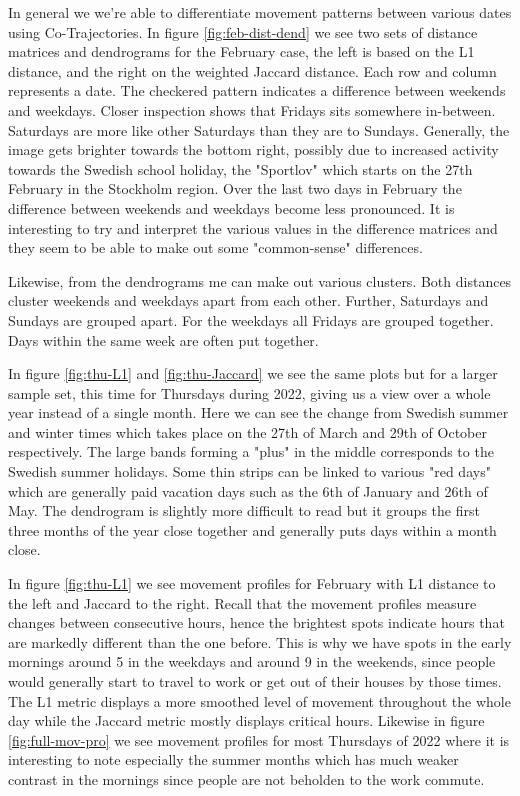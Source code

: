 \documentclass[../main.tex]{subfiles}
\begin{document}
In general we we're able to differentiate movement patterns between various dates using Co-Trajectories. In figure \ref{fig:feb-dist-dend} we see two sets of distance matrices and dendrograms for the February case, the left is based on the L1 distance, and the right on the weighted Jaccard distance. Each row and column represents a date. The checkered pattern indicates a difference between weekends and weekdays. Closer inspection shows that Fridays sits somewhere in-between. Saturdays are more like other Saturdays than they are to Sundays. Generally, the image gets brighter towards the bottom right, possibly due to increased activity towards the Swedish school holiday, the "Sportlov" which starts on the 27th February in the Stockholm region. Over the last two days in February the difference between weekends and weekdays become less pronounced. It is interesting to try and interpret the various values in the difference matrices and they seem to be able to make out some "common-sense" differences.

Likewise, from the dendrograms me can make out various clusters. Both distances cluster weekends and weekdays apart from each other. Further, Saturdays and Sundays are grouped apart. For the weekdays all Fridays are grouped together. Days within the same week are often put together. 

In figure \ref{fig:thu-L1} and \ref{fig:thu-Jaccard} we see the same plots but for a larger sample set, this time for Thursdays during 2022, giving us a view over a whole year instead of a single month. Here we can see the change from Swedish summer and winter times which takes place on the 27th of March and 29th of October respectively. The large bands forming a "plus" in the middle corresponds to the Swedish summer holidays. Some thin strips can be linked to various "red days" which are generally paid vacation days such as the 6th of January and 26th of May.
The dendrogram is slightly more difficult to read but it groups the first three months of the year close together and generally puts days within a month close.

In figure \ref{fig:thu-L1} we see movement profiles for February with L1 distance to the left and Jaccard to the right. Recall that the movement profiles measure changes between consecutive hours, hence the brightest spots indicate hours that are markedly different than the one before. This is why we have spots in the early mornings around 5 in the weekdays and around 9 in the weekends, since people would generally start to travel to work or get out of their houses by those times. The L1 metric displays a more smoothed level of movement throughout the whole day while the Jaccard metric mostly displays critical hours. Likewise in figure \ref{fig:full-mov-pro} we see movement profiles for most Thursdays of 2022 where it is interesting to note especially the summer months which has much weaker contrast in the mornings since people are not beholden to the work commute.
\end{document}
